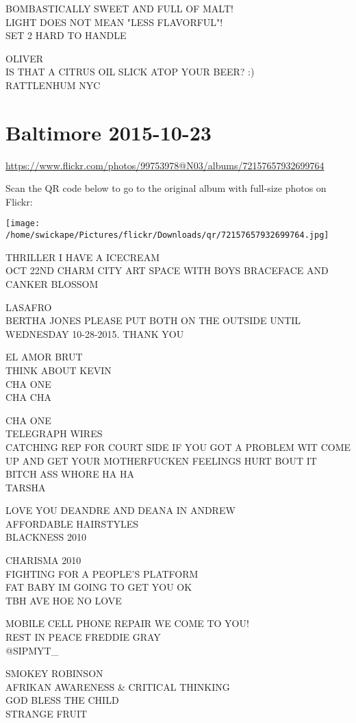 \documentclass[10pt,letterpaper]{article}
\begin{document}
BOMBASTICALLY SWEET AND FULL OF MALT!\\
LIGHT DOES NOT MEAN "LESS FLAVORFUL"!\\
SET 2 HARD TO HANDLE

OLIVER\\
IS THAT A CITRUS OIL SLICK ATOP YOUR BEER? :)\\
RATTLENHUM NYC


\section*{Baltimore 2015-10-23}

\url{https://www.flickr.com/photos/99753978@N03/albums/72157657932699764}

Scan the QR code below to go to the original album with full-size photos on Flickr:

\texttt{[image: /home/swickape/Pictures/flickr/Downloads/qr/72157657932699764.jpg]}


THRILLER I HAVE A ICECREAM\\
OCT 22ND CHARM CITY ART SPACE WITH BOYS BRACEFACE AND CANKER BLOSSOM

LASAFRO\\
BERTHA JONES PLEASE PUT BOTH ON THE OUTSIDE UNTIL WEDNESDAY 10{-}28{-}2015.  THANK YOU

EL AMOR BRUT\\
THINK ABOUT KEVIN\\
CHA ONE\\
CHA CHA

CHA ONE\\
TELEGRAPH WIRES\\
CATCHING REP FOR COURT SIDE IF YOU GOT A PROBLEM WIT COME UP AND GET YOUR MOTHERFUCKEN FEELINGS HURT BOUT IT BITCH ASS WHORE HA HA\\
TARSHA

LOVE YOU DEANDRE AND DEANA IN ANDREW\\
AFFORDABLE HAIRSTYLES\\
BLACKNESS 2010

CHARISMA 2010\\
FIGHTING FOR A PEOPLE'S PLATFORM\\
FAT BABY IM GOING TO GET YOU OK\\
TBH AVE HOE NO LOVE

MOBILE CELL PHONE REPAIR WE COME TO YOU!\\
REST IN PEACE FREDDIE GRAY\\
@SIPMYT\_

SMOKEY ROBINSON\\
AFRIKAN AWARENESS \& CRITICAL THINKING\\
GOD BLESS THE CHILD\\
STRANGE FRUIT
\end{document}
